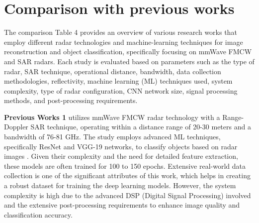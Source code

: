\documentclass[journal,article,submit,pdftex,moreauthors]{Definitions/mdpi}
\begin{document}
\section{Comparison with previous works}
The comparison Table 4 provides an overview of various research works that employ different radar technologies and machine-learning techniques for image reconstruction and object classification, specifically focusing on mmWave FMCW and SAR radars. Each study is evaluated based on parameters such as the type of radar, SAR technique, operational distance, bandwidth, data collection methodologies, reflectivity, machine learning (ML) techniques used, system complexity, type of radar configuration, CNN network size, signal processing methods, and post-processing requirements.



\textbf{Previous Works 1} utilizes mmWave FMCW radar technology with a Range-Doppler SAR technique, operating within a distance range of 20-30 meters and a bandwidth of 76-81 GHz. The study employs advanced ML techniques, specifically ResNet and VGG-19 networks, to classify objects based on radar images \cite{he2016deep,smith2022radar,park2020high,li2020wireless,zhang2022neural}. Given their complexity and the need for detailed feature extraction, these models are often trained for 100 to 150 epochs. Extensive real-world data collection is one of the significant attributes of this work, which helps in creating a robust dataset for training the deep learning models. However, the system complexity is high due to the advanced DSP (Digital Signal Processing) involved and the extensive post-processing requirements to enhance image quality and classification accuracy.
\end{document}
